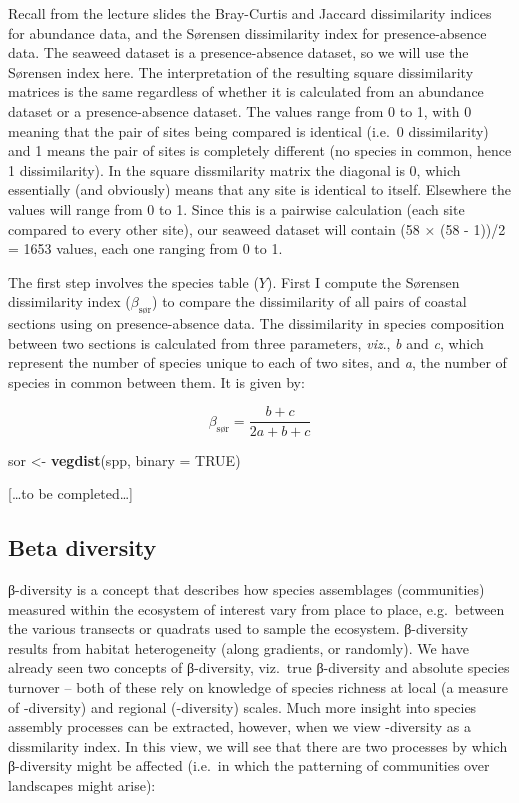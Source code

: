 \documentclass[10pt,a4,]{article}
\newenvironment{Shaded}{\begin{snugshade}}{\end{snugshade}}
\newcommand{\DataTypeTok}[1]{\textcolor[rgb]{0.13,0.29,0.53}{#1}}
\newcommand{\KeywordTok}[1]{\textcolor[rgb]{0.13,0.29,0.53}{\textbf{#1}}}
\newcommand{\NormalTok}[1]{#1}
\newcommand{\OtherTok}[1]{\textcolor[rgb]{0.56,0.35,0.01}{#1}}
\newcommand{\StringTok}[1]{\textcolor[rgb]{0.31,0.60,0.02}{#1}}
\begin{document}
Recall from the lecture slides the Bray-Curtis and Jaccard dissimilarity
indices for abundance data, and the Sørensen dissimilarity index for
presence-absence data. The seaweed dataset is a presence-absence
dataset, so we will use the Sørensen index here. The interpretation of
the resulting square dissimilarity matrices is the same regardless of
whether it is calculated from an abundance dataset or a presence-absence
dataset. The values range from 0 to 1, with 0 meaning that the pair of
sites being compared is identical (i.e.~0 dissimilarity) and 1 means the
pair of sites is completely different (no species in common, hence 1
dissimilarity). In the square dissmilarity matrix the diagonal is 0,
which essentially (and obviously) means that any site is identical to
itself. Elsewhere the values will range from 0 to 1. Since this is a
pairwise calculation (each site compared to every other site), our
seaweed dataset will contain (58 × (58 - 1))/2 = 1653 values, each one
ranging from 0 to 1.

The first step involves the species table (\(Y\)). First I compute the
Sørensen dissimilarity index (\(\beta_{\text{sør}}\)) to compare the
dissimilarity of all pairs of coastal sections using on presence-absence
data. The dissimilarity in species composition between two sections is
calculated from three parameters, \emph{viz}., \emph{b} and \emph{c},
which represent the number of species unique to each of two sites, and
\emph{a}, the number of species in common between them. It is given by:

\[\beta_\text{sør}=\frac{b+c}{2a+b+c}\]

\begin{Shaded}
\begin{Highlighting}[]
\NormalTok{sor <{-}}\StringTok{ }\KeywordTok{vegdist}\NormalTok{(spp, }\DataTypeTok{binary =} \OtherTok{TRUE}\NormalTok{)}
\end{Highlighting}
\end{Shaded}

{[}\ldots to be completed\ldots{]}

\subsection{Beta diversity}

β-diversity is a concept that describes how species assemblages
(communities) measured within the ecosystem of interest vary from place
to place, e.g.~between the various transects or quadrats used to sample
the ecosystem. β-diversity results from habitat heterogeneity (along
gradients, or randomly). We have already seen two concepts of
β-diversity, viz.~true β-diversity and absolute species turnover -- both
of these rely on knowledge of species richness at local (a measure of
\textalpha-diversity) and regional (\textgamma-diversity) scales. Much
more insight into species assembly processes can be extracted, however,
when we view \textbeta-diversity as a dissmilarity index. In this view,
we will see that there are two processes by which β-diversity might be
affected (i.e.~in which the patterning of communities over landscapes
might arise):
\end{document}
